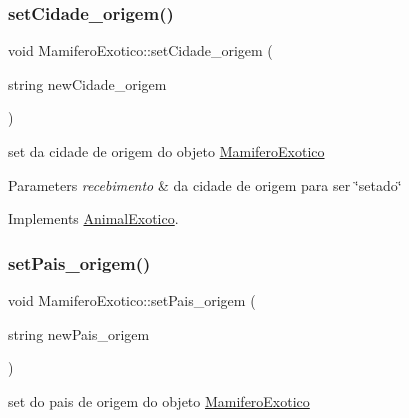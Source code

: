 \mbox{\label{class_mamifero_exotico_a1f94a59bbdab189a39fdffcf278d9ca7}} 
\subsubsection{\texorpdfstring{setCidade\_origem()}{setCidade\_origem()}}
{\footnotesize\ttfamily void Mamifero\+Exotico\+::set\+Cidade\+\_\+origem (\begin{DoxyParamCaption}\item[{string}]{new\+Cidade\+\_\+origem }\end{DoxyParamCaption})\hspace{0.3cm}{\ttfamily [virtual]}}



set da cidade de origem do objeto \mbox{\hyperlink{class_mamifero_exotico}{Mamifero\+Exotico}} 


\begin{DoxyParams}{Parameters}
{\em recebimento} & da cidade de origem para ser \char`\"{}setado\char`\"{} \\
\hline
\end{DoxyParams}


Implements \mbox{\hyperlink{class_animal_exotico}{Animal\+Exotico}}.

\mbox{\label{class_mamifero_exotico_a7d01fddb042cad93fdf65d6ffd235ec8}} 
\subsubsection{\texorpdfstring{setPais\_origem()}{setPais\_origem()}}
{\footnotesize\ttfamily void Mamifero\+Exotico\+::set\+Pais\+\_\+origem (\begin{DoxyParamCaption}\item[{string}]{new\+Pais\+\_\+origem }\end{DoxyParamCaption})\hspace{0.3cm}{\ttfamily [virtual]}}



set do pais de origem do objeto \mbox{\hyperlink{class_mamifero_exotico}{Mamifero\+Exotico}} 


